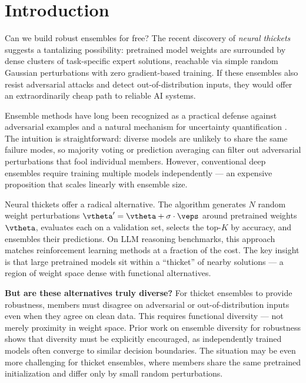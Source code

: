 \section{Introduction}
\label{sec:intro}

Can we build robust ensembles for free? The recent discovery of \emph{neural thickets} \citep{gan2026neural} suggests a tantalizing possibility: pretrained model weights are surrounded by dense clusters of task-specific expert solutions, reachable via simple random Gaussian perturbations with zero gradient-based training. If these ensembles also resist adversarial attacks and detect out-of-distribution inputs, they would offer an extraordinarily cheap path to reliable AI systems.

Ensemble methods have long been recognized as a practical defense against adversarial examples \citep{pang2019improving} and a natural mechanism for uncertainty quantification \citep{fort2019deep}. The intuition is straightforward: diverse models are unlikely to share the same failure modes, so majority voting or prediction averaging can filter out adversarial perturbations that fool individual members. However, conventional deep ensembles require training multiple models independently --- an expensive proposition that scales linearly with ensemble size.

Neural thickets \citep{gan2026neural} offer a radical alternative. The \randopt algorithm generates $N$ random weight perturbations $\vtheta' = \vtheta + \sigma \cdot \veps$ around pretrained weights $\vtheta$, evaluates each on a validation set, selects the top-$K$ by accuracy, and ensembles their predictions. On LLM reasoning benchmarks, this approach matches reinforcement learning methods at a fraction of the cost. The key insight is that large pretrained models sit within a ``thicket'' of nearby solutions --- a region of weight space dense with functional alternatives.

{\bf But are these alternatives truly diverse?} For thicket ensembles to provide robustness, members must disagree on adversarial or out-of-distribution inputs even when they agree on clean data. This requires functional diversity --- not merely proximity in weight space. Prior work on ensemble diversity for robustness \citep{pang2019improving, zhao2024ensemble} shows that diversity must be explicitly encouraged, as independently trained models often converge to similar decision boundaries. The situation may be even more challenging for thicket ensembles, where members share the same pretrained initialization and differ only by small random perturbations.

